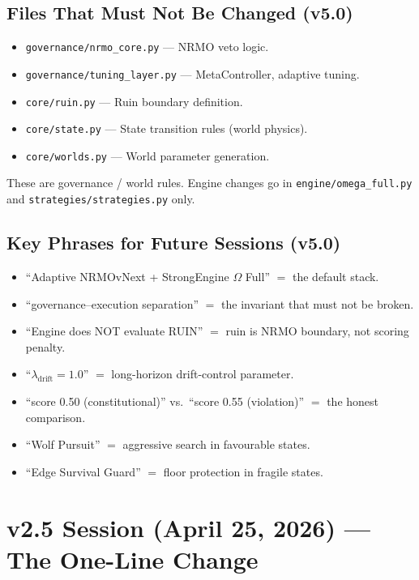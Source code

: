 \subsection{Files That Must Not Be Changed (v5.0)}
\label{sec:methodology-v50-frozen}

\begin{itemize}
\item \texttt{governance/nrmo\_core.py} --- NRMO veto logic.
\item \texttt{governance/tuning\_layer.py} --- MetaController,
adaptive tuning.
\item \texttt{core/ruin.py} --- Ruin boundary definition.
\item \texttt{core/state.py} --- State transition rules (world
physics).
\item \texttt{core/worlds.py} --- World parameter generation.
\end{itemize}

These are governance / world rules. Engine changes go in
\texttt{engine/omega\_full.py} and \texttt{strategies/strategies.py}
only.

\subsection{Key Phrases for Future Sessions (v5.0)}
\label{sec:methodology-v50-phrases}

\begin{itemize}
\item ``Adaptive NRMOvNext + StrongEngine $\Omega$ Full'' $=$ the
default stack.
\item ``governance--execution separation'' $=$ the invariant that
must not be broken.
\item ``Engine does NOT evaluate RUIN'' $=$ ruin is NRMO boundary,
not scoring penalty.
\item ``$\lambda_{\mathrm{drift}} = 1.0$'' $=$ long-horizon
drift-control parameter.
\item ``score 0.50 (constitutional)'' vs.~``score 0.55 (violation)''
$=$ the honest comparison.
\item ``Wolf Pursuit'' $=$ aggressive search in favourable states.
\item ``Edge Survival Guard'' $=$ floor protection in fragile
states.
\end{itemize}

\section{v2.5 Session (April 25, 2026) ---
The One-Line Change}
\label{sec:methodology-v25-session}

